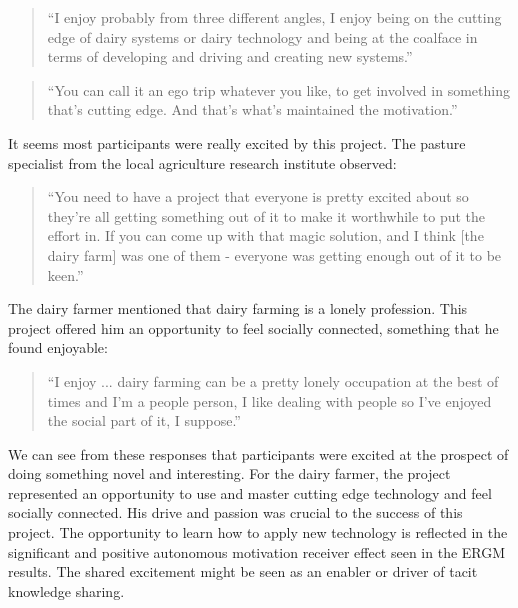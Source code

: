 \begin{quote}
\small
\enquote{I enjoy probably from three different angles, I enjoy being on the cutting edge of dairy systems or dairy technology and being at the coalface in terms of developing and driving and creating new systems.} \\
\end{quote}

\begin{quote}
\small
\enquote{You can call it an ego trip whatever you like, to get involved in something that's cutting edge. And that's what's maintained the motivation.} \\
\end{quote}

It seems most participants were really excited by this project. The pasture specialist from the local agriculture research institute observed:

\begin{quote}
\small
\enquote{You need to have a project that everyone is pretty excited about so they're all getting something out of it to make it worthwhile to put the effort in. If you can come up with that magic solution, and I think [the dairy farm] was one of them - everyone was getting enough out of it to be keen.} \\
\end{quote}

The dairy farmer mentioned that dairy farming is a lonely profession. This project offered him an opportunity to feel socially connected, something that he found enjoyable:

\begin{quote}
\small
\enquote{I enjoy ... dairy farming can be a pretty lonely occupation at the best of times and I'm a people person, I like dealing with people so I've enjoyed the social part of it, I suppose.} \\
\end{quote}

We can see from these responses that participants were excited at the prospect of doing something novel and interesting. For the dairy farmer, the project represented an opportunity to use and master cutting edge technology and feel socially connected. His drive and passion was crucial to the success of this project. The opportunity to learn how to apply new technology is reflected in the significant and positive autonomous motivation receiver effect seen in the ERGM results. The shared excitement might be seen as an enabler or driver of tacit knowledge sharing.

